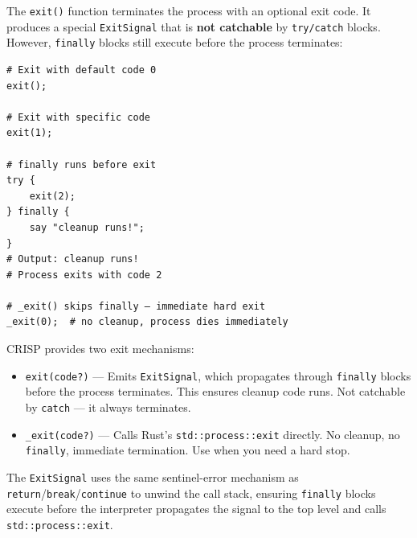 The \texttt{exit()} function terminates the process with an optional exit code. It produces a special \texttt{ExitSignal} that is \textbf{not catchable} by \texttt{try/catch} blocks. However, \texttt{finally} blocks still execute before the process terminates:

\begin{tcolorbox}[colback=codebg, colframe=darkpurple, colbacktitle=darkpurple, title=\textbf{\textcolor{codegold}{Exit}}, fonttitle=\bfseries, sharp corners]
\begin{lstlisting}
# Exit with default code 0
exit();

# Exit with specific code
exit(1);

# finally runs before exit
try {
    exit(2);
} finally {
    say "cleanup runs!";
}
# Output: cleanup runs!
# Process exits with code 2

# _exit() skips finally — immediate hard exit
_exit(0);  # no cleanup, process dies immediately
\end{lstlisting}
\end{tcolorbox}

\begin{tcolorbox}[colback=lightlavender, colframe=softvioletdark, title=\textbf{\textcolor{darkpurple}{Design Note: ExitSignal vs. \_exit}}, fonttitle=\bfseries, sharp corners]
CRISP provides two exit mechanisms:

\begin{itemize}
    \item \texttt{exit(code?)} — Emits \texttt{ExitSignal}, which propagates through \texttt{finally} blocks before the process terminates. This ensures cleanup code runs. Not catchable by \texttt{catch} — it always terminates.
    \item \texttt{\_exit(code?)} — Calls Rust's \texttt{std::process::exit} directly. No cleanup, no \texttt{finally}, immediate termination. Use when you need a hard stop.
\end{itemize}

The \texttt{ExitSignal} uses the same sentinel-error mechanism as \texttt{return}/\texttt{break}/\texttt{continue} to unwind the call stack, ensuring \texttt{finally} blocks execute before the interpreter propagates the signal to the top level and calls \texttt{std::process::exit}.
\end{tcolorbox}

